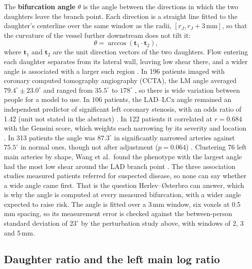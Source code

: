 The \textbf{bifurcation angle} $\theta$ is the angle between the directions in which the two daughters leave the branch point.
Each direction is a straight line fitted to the daughter's centerline over the same window as the radii, $[r_J, r_J + 3\,\mathrm{mm}]$, so that the curvature of the vessel further downstream does not tilt it:
\begin{equation}
  \theta = \arccos\left(\mathbf{t}_1 \cdot \mathbf{t}_2\right),
  \label{eq:risk-angle}
\end{equation}
where $\mathbf{t}_1$ and $\mathbf{t}_2$ are the unit direction vectors of the two daughters.
Flow entering each daughter separates from its lateral wall, leaving low shear there, and a wider angle is associated with a larger such region \cite{murasato2022bifurcation}.
In 196 patients imaged with coronary computed tomography angiography (CCTA), the LM angle averaged $79.4^\circ \pm 23.0^\circ$ and ranged from $35.5^\circ$ to $178^\circ$ \cite{temov2016bifurcation}, so there is wide variation between people for a model to use.
In 106 patients, the LAD--LCx angle remained an independent predictor of significant left coronary stenosis, with an odds ratio of 1.42 (unit not stated in the abstract) \cite{cui2017bifurcation}.
In 122 patients it correlated at $r = 0.684$ with the Gensini score, which weights each narrowing by its severity and location \cite{mansouri2024bifurcation}.
In 313 patients the angle was $87.3^\circ$ in significantly narrowed arteries against $75.5^\circ$ in normal ones, though not after adjustment ($p = 0.064$) \cite{juan2017bifurcation}.
Clustering 76 left main arteries by shape, Wang et al.\ found the phenotype with the largest angle had the most low shear around the LAD branch point \cite{wang2024lmphenotypes}.
The three association studies measured patients referred for suspected disease, so none can say whether a wide angle came first.
That is the question Herlev--{\O}sterbro can answer, which is why the angle is computed at every measured bifurcation, with a wider angle expected to raise risk.
The angle is fitted over a 3\,mm window, six voxels at 0.5\,mm spacing, so its measurement error is checked against the between-person standard deviation of $23^\circ$ by the perturbation study above, with windows of 2, 3 and 5\,mm.

\subsection{Daughter ratio and the left main log ratio}

